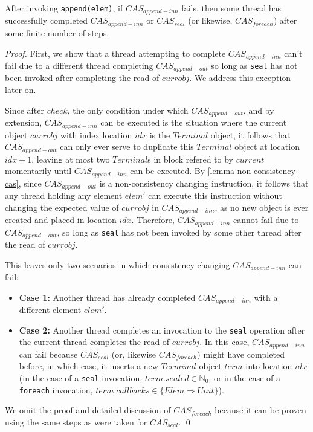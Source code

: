 \documentclass[runningheads,a4paper]{llncs}
\begin{document}

\begin{lemma}\label{lemma-cas2} After invoking \verb=append(elem)=, if
$CAS_{append-inn}$ fails, then some thread has successfully completed 
$CAS_{append-inn}$ or $CAS_{seal}$ (or likewise, $CAS_{foreach}$) after some 
finite number of steps.
\end{lemma}

\begin{proof}
First, we show that a thread attempting to complete $CAS_{append-inn}$ can't fail due to a
different thread completing $CAS_{append-out}$ so long as \verb=seal= has not been invoked
after completing the read of $currobj$. We address this exception later on.

Since after $check$, the only condition under which $CAS_{append-out}$, and by
extension, $CAS_{append-inn}$ can be executed is the situation where the
current object $currobj$ with index location $idx$ is the $Terminal$ object,
it follows that $CAS_{append-out}$ can only ever serve to duplicate this
$Terminal$ object at location $idx+1$, leaving at most two $Terminal$s in
block refered to by $current$ momentarily until $CAS_{append-inn}$ can be
executed. By \ref{lemma-non-consistency-cas}, since $CAS_{append-out}$ is a non-consistency changing
instruction, it follows that any thread holding any element $elem'$ can
execute this instruction without changing the expected value of $currobj$ in
$CAS_{append-inn}$, as no new object is ever created and placed in location
$idx$. Therefore, $CAS_{append-inn}$ cannot fail due to $CAS_{append-out}$, so
long as \verb=seal= has not been invoked by some other thread after the read
of $currobj$.

This leaves only two scenarios in which consistency changing 
$CAS_{append-inn}$ can fail:

\begin{itemize}
\item \textbf{Case 1:} Another thread has already completed $CAS_{append-inn}$ with a 
different element $elem'$.
\item \textbf{Case 2:} Another thread completes an invocation to the \verb=seal= 
operation after the current thread completes the read of $currobj$. In this 
case, $CAS_{append-inn}$ can fail because $CAS_{seal}$ (or, likewise $CAS_{foreach}$) 
might have completed before, in which case, it inserts a new $Terminal$ object $term$ 
into location $idx$ (in the case of a \verb=seal= invocation, 
$term.sealed\in\mathbb{N}_0$, or in the case of a \verb=foreach= invocation, 
$term.callbacks\in\{Elem \Rightarrow Unit\}$). 
\end{itemize}

We omit the proof and detailed discussion of $CAS_{foreach}$ because it can be proven 
using the same steps as were taken for $CAS_{seal}$. 
\qed
\end{proof}
\end{document}
